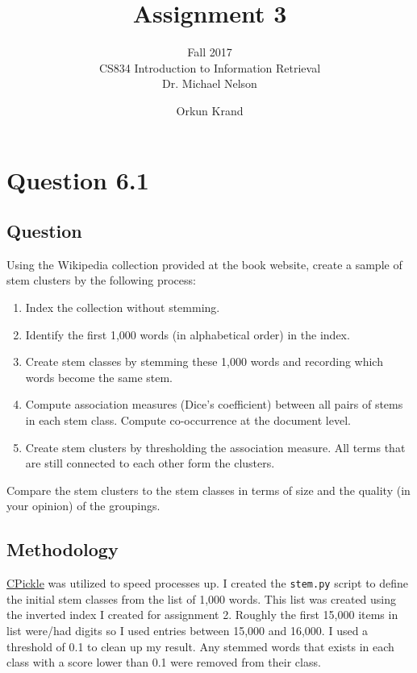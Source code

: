 \documentclass[10pt,letterpaper,bibliography=totoc]{scrartcl}
\begin{document}
\author{Orkun Krand}
\title{Assignment 3}
\subtitle{Fall 2017\\ CS834 Introduction to Information Retrieval\\ Dr. Michael Nelson}
\maketitle
\newpage

\section{Question 6.1}
\subsection {Question}
Using the Wikipedia collection provided at the book website, create a sample of stem clusters by the following process:
\begin{enumerate}
    \item Index the collection without stemming.
    \item Identify the first 1,000 words (in alphabetical order) in the index.
    \item Create stem classes by stemming these 1,000 words and recording which words become the same stem.
    \item Compute association measures (Dice's coefficient) between all pairs of stems in each stem class. Compute co-occurrence at the document level.
    \item Create stem clusters by thresholding the association measure. All terms that are still connected to each other form the clusters.
\end{enumerate}

Compare the stem clusters to the stem classes in terms of size and the quality (in your opinion) of the groupings.

\subsection{Methodology}
\href{https://docs.python.org/2.3/lib/module-cPickle.html}{CPickle} was utilized to speed processes up. I created the \texttt{stem.py} script to define the initial stem classes from the list of 1,000 words.  This list was created using the inverted index I created for assignment 2. Roughly the first 15,000 items in list were/had digits so I used entries between 15,000 and 16,000. I used a threshold of 0.1 to clean up my result. Any stemmed words that exists in each class with a score lower than 0.1 were removed from their class. 
\end{document}
